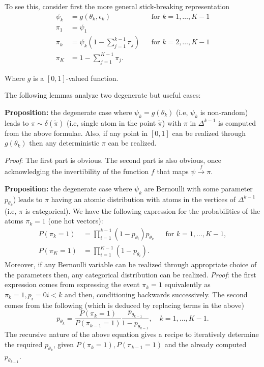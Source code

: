 \documentclass{article}
\begin{document}
To see this, consider first the more general stick-breaking representation
\begin{align}
  \psi_k & = g(\theta_k,\epsilon_k)& &  \text{for } k=1, \ldots, K-1\\
  {\pi}_1 &= \psi_1 \\
  {\pi}_k &= \psi_k \left(1- \sum_{j=1}^{k-1} {\pi}_j\right) & &  \text{for } k=2, \ldots, K-1\\
{\pi}_K &= 1- \sum_{j=1}^{K-1} {\pi}_j.
\end{align}

Where $g$ is a $[0,1]$-valued function. 

The following lemmas analyze two degenerate but useful cases:

\textbf{Proposition:}  the degenerate case where $\psi_k=g(\theta_k)$ (i.e, $\psi_k$ is non-random) leads to $\pi\sim \delta(\tilde{\pi})$  (i.e, single atom in the point $\tilde{\pi}$) with $\pi$ in $\Delta^{k-1}$ is computed from the above formulae. Also, if any point in $[0,1]$ can be realized through $g(\theta_k)$ then any deterministic $\pi$ can be realized.

\textit{Proof}: The first part is obvious. The second part is also obvious, once acknowledging the invertibility of the function $f$ that maps $\psi \xrightarrow{f} \pi$.

\textbf{Proposition:} the degenerate case where  $\psi_k$ are Bernoulli with some parameter $p_{\theta_k}$) leads to $\pi$ having an atomic distribution with atoms in the vertices of $\Delta^{k-1}$ (i.e, $\pi$ is categorical). We have the following expression for the probabilities of the atoms $\pi_k=1$ (one hot vectors):
\begin{align}
P(\pi_k =1)&= \prod_{i=1}^{k-1} (1-p_{\theta_i}) p_{\theta_k}  & &\text{for } k=1, \ldots, K-1,\\
P(\pi_K =1) &= \prod_{i=1}^{K-1} (1-p_{\theta_i}).
\end{align}
Moreover, if any Bernoulli variable can be realized through appropriate choice of the parameters then, any categorical distribution can be realized.
\textit{Proof}: the first expression comes from expressing the event $\pi_k=1$ equivalently as $\pi_k=1,p_i=0 i<k$ and then, conditioning backwards successively. The second comes from the following (which is deduced by replacing terms in the above)
$$ p_{\theta_k}=\frac{P(\pi_k =1)}{P(\pi_{k-1} =1)}\frac{p_{\theta_{k-1}}}{1-p_{\theta_{k-1}}},\quad k =1,\ldots, K-1.$$
The recursive nature of the above equation gives a recipe to iteratively determine the required $p_{\theta_k}$, given  $P(\pi_k =1), P(\pi_{k-1} =1)$ and the already computed $p_{\theta_{k-1}}$.
\end{document}
